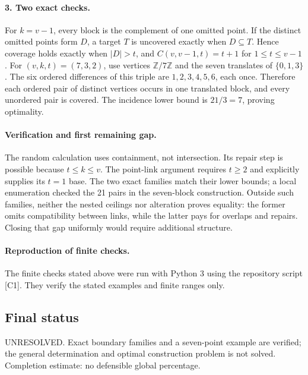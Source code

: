 \documentclass[11pt,a4paper]{article}
\begin{document}
\paragraph{3. Two exact checks.}
For $k=v-1$, every block is the complement of one omitted point. If
the distinct omitted points form $D$, a target $T$ is uncovered exactly
when $D\subseteq T$. Hence coverage holds exactly when $|D|>t$,
and $C(v,v-1,t)=t+1$ for $1\le t\le v-1$.
For $(v,k,t)=(7,3,2)$, use vertices $\mathbb Z/7\mathbb Z$ and
the seven translates of $\{0,1,3\}$. The six ordered differences of
this triple are $1,2,3,4,5,6$, each once. Therefore each ordered pair
of distinct vertices occurs in one translated block, and every unordered
pair is covered. The incidence lower bound is $21/3=7$, proving optimality.

\paragraph{Verification and first remaining gap.}
The random calculation uses containment, not intersection. Its repair
step is possible because $t\le k\le v$. The point-link argument
requires $t\ge2$ and explicitly supplies its $t=1$ base. The two exact
families match their lower bounds; a local enumeration checked the 21
pairs in the seven-block construction. Outside such families, neither
the nested ceilings nor alteration proves equality: the former omits
compatibility between links, while the latter pays for overlaps and
repairs. Closing that gap uniformly would require additional structure.

\paragraph{Reproduction of finite checks.}
The finite checks stated above were run with Python 3 using the repository
script [C1]. They verify the stated examples and finite ranges only.

\subsection{Final status}
UNRESOLVED. Exact boundary families and a seven-point example are
verified; the general determination and optimal construction problem is
not solved. Completion estimate: no defensible global percentage.
\end{document}
